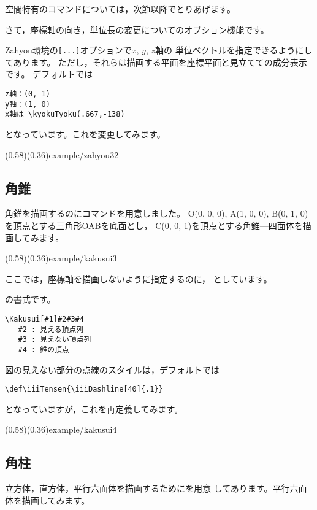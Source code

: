 空間特有のコマンドについては，次節以降でとりあげます。

さて，座標軸の向き，単位長の変更についてのオプション機能です。

\textsf{Zahyou}環境の\texttt{[...]}オプションで$x$, $y$, $z$軸の
単位ベクトルを指定できるようにしてあります。
ただし，それらは描画する平面を座標平面と見立てての成分表示です。
デフォルトでは
\begin{jquote}
\begin{verbatim}
z軸：(0, 1)
y軸：(1, 0)
x軸は \kyokuTyoku(.667,-138)
\end{verbatim}
\end{jquote}
となっています。これを変更してみます。

\showexample[基本単位ベクトルの変更](0.58)(0.36){example/zahyou32}

\subsection{角錐}
角錐を描画するのにコマンドを用意しました。
O(0, 0, 0), A(1, 0, 0), B(0, 1, 0)を頂点とする三角形OABを底面とし，
C(0, 0, 1)を頂点とする角錐---四面体を描画してみます。

\showexample[角錐](0.58)(0.36){example/kakusui3}

ここでは，座標軸を描画しないように指定するのに，
としています。

の書式です。
\begin{boxnote}
\begin{verbatim}
\Kakusui[#1]#2#3#4
   #2 : 見える頂点列
   #3 : 見えない頂点列
   #4 : 錐の頂点
\end{verbatim}
\end{boxnote}

図の見えない部分の点線のスタイルは，デフォルトでは

\begin{jquote}
\begin{verbatim}
\def\iiiTensen{\iiiDashline[40]{.1}}
\end{verbatim}
\end{jquote}
となっていますが，これを再定義してみます。

(0.58)(0.36){example/kakusui4}

\subsection{角柱}
立方体，直方体，平行六面体を描画するためにを用意
してあります。平行六面体を描画してみます。

